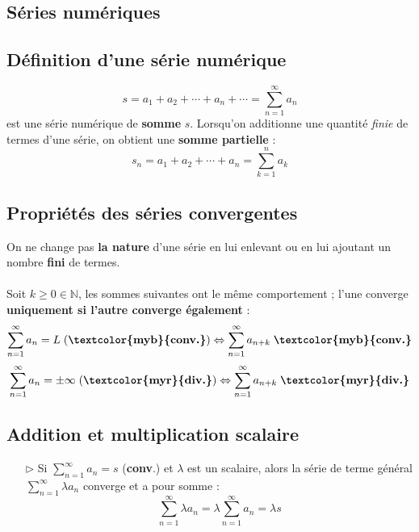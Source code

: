 \documentclass{report}
\begin{document}
\begin{multicols*}{3}


    \chapter{Séries numériques}

    \section{Définition d'une série numérique}
    \vspace{-2em}
        $$s = a_1 + a_2 + \cdots + a_n + \cdots = \sum_{n=1}^{\infty }a_n$$
        est une série numérique de \textbf{somme} $s$. Lorsqu'on additionne
        une quantité \textit{finie} de termes d'une série, on obtient une \textbf{somme partielle} :
        $$s_n = a_1 + a_2 + \cdots + a_n = \sum_{k=1}^{n }a_k $$ 

    \section{Propriétés des séries convergentes}
        On ne change pas \textcolor{myb}{\textbf{la nature}}  
        d'une série en lui enlevant ou en lui ajoutant un 
        nombre \textbf{fini} de termes.  
        \\\\
        Soit $k \geq 0 \in \mathbb{N}$, les sommes suivantes ont le même comportement ; l'une converge 
        \textbf{uniquement si l'autre converge également}  :
        \[%
            \sum_{n=1}^{\infty }a_n = L \; (\textbf{\textcolor{myb}{conv.}})  
            \Leftrightarrow 
            \sum_{n=1}^{\infty }a_{n+k} \; \textbf{\textcolor{myb}{conv.}}  
        \]%
        \[%
            \sum_{n=1}^{\infty }a_n  = \pm \infty \;  (\textbf{\textcolor{myr}{div.}})  
            \Leftrightarrow 
            \sum_{n=1}^{\infty }a_{n+k} \; \textbf{\textcolor{myr}{div.}}  
        \]%



    \section{Addition et multiplication scalaire}
    \begin{itemize}
        \item[$\rhd$] Si \(\sum_{n=1}^{\infty } a_n = s\) (\textcolor{myb}{\textbf{conv}}.) 
            et \(\lambda\) est un scalaire, 
            alors la série de terme général 
            \(\sum_{n=1}^{\infty }\lambda a_n\) converge et a pour somme :
        \[
            \boxed{ 
        \sum_{n=1}^{\infty } \lambda a_n = \lambda \sum_{n=1}^{\infty } a_n = \lambda s
        }
        \]
        

\end{itemize}
\end{multicols*}
\end{document}
